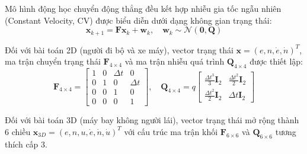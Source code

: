 \hspace{0.5cm} Mô hình động học chuyển động thẳng đều kết hợp nhiễu gia tốc ngẫu nhiên (Constant Velocity, CV) được biểu diễn dưới dạng không gian trạng thái:
\begin{equation}
\mathbf{x}_{k+1} = \mathbf{F} \mathbf{x}_k + \mathbf{w}_k, \quad \mathbf{w}_k \sim \mathcal{N}(\mathbf{0}, \mathbf{Q})
\label{eq:state-space-model}
\end{equation}

Đối với bài toán 2D (người đi bộ và xe máy), vector trạng thái $\mathbf{x} = (e, n, \dot{e}, \dot{n})^T$, ma trận chuyển trạng thái $\mathbf{F}_{4 \times 4}$ và ma trận nhiễu quá trình $\mathbf{Q}_{4 \times 4}$ được thiết lập:
\begin{equation}
\mathbf{F}_{4 \times 4} = \begin{bmatrix} 1 & 0 & \Delta t & 0 \\ 0 & 1 & 0 & \Delta t \\ 0 & 0 & 1 & 0 \\ 0 & 0 & 0 & 1 \end{bmatrix}, \quad \mathbf{Q}_{4 \times 4} = q \begin{bmatrix} \frac{\Delta t^3}{3}\mathbf{I}_2 & \frac{\Delta t^2}{2}\mathbf{I}_2 \\ \frac{\Delta t^2}{2}\mathbf{I}_2 & \Delta t\mathbf{I}_2 \end{bmatrix}
\label{eq:f-and-q-matrices-2d}
\end{equation}

Đối với bài toán 3D (máy bay không người lái), vector trạng thái mở rộng thành 6 chiều $\mathbf{x}_{3D} = (e, n, u, \dot{e}, \dot{n}, \dot{u})^T$ với cấu trúc ma trận khối $\mathbf{F}_{6 \times 6}$ và $\mathbf{Q}_{6 \times 6}$ tương thích cấp 3.

\begin{table}[H]
\centering
\caption{Đặc tính ma trận trạng thái và thông số phổ nhiễu gia tốc $q$ theo loại mục tiêu}
\label{tab:target-dynamics-parameters}
\end{table}

